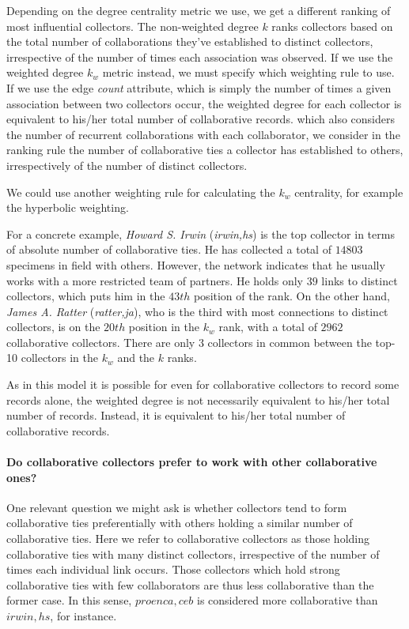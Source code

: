 Depending on the degree centrality metric we use, we get a different ranking of most influential collectors.
The non-weighted degree $k$ ranks collectors based on the total number of collaborations they've established to distinct collectors, irrespective of the number of times each association was observed.
If we use the weighted degree $k_w$ metric instead, we must specify which weighting rule to use. If we use the edge \textit{count} attribute, which is simply the number of times a given association between two collectors occur, the weighted degree for each collector is equivalent to his/her total number of collaborative records. which also considers the number of recurrent collaborations with each collaborator, we consider in the ranking rule the number of collaborative ties a collector has established to others, irrespectively of the number of distinct collectors.

We could use another weighting rule for calculating the $k_w$ centrality, for example the hyperbolic weighting.


For a concrete example, \textit{Howard S. Irwin} (\textit{irwin,hs}) is the top collector in terms of absolute number of collaborative ties. He has collected a total of $14803$ specimens in field with others. However, the network indicates that he usually works with a more restricted team of partners. He holds only $39$ links to distinct collectors, which puts him in the $43th$ position of the rank. 
On the other hand, \textit{James A. Ratter} (\textit{ratter,ja}), who is the third with most connections to distinct collectors, is on the $20th$ position in the $k_w$ rank, with a total of $2962$ collaborative collectors.
There are only $3$ collectors in common between the top-10 collectors in the $k_w$ and the $k$ ranks.

As in this model it is possible for even for collaborative collectors to record some records alone, the weighted degree is not necessarily equivalent to his/her total number of records. Instead, it is equivalent to his/her total number of collaborative records.

\paragraph*{Do collaborative collectors prefer to work with other collaborative ones?}
One relevant question we might ask is whether collectors tend to form collaborative ties preferentially with others holding a similar number of collaborative ties.
Here we refer to collaborative collectors as those holding collaborative ties with many distinct collectors, irrespective of the number of times each individual link occurs. Those collectors which hold strong collaborative ties with few collaborators are thus less collaborative than the former case. In this sense, $proenca,ceb$ is considered more collaborative than $irwin,hs$, for instance.

